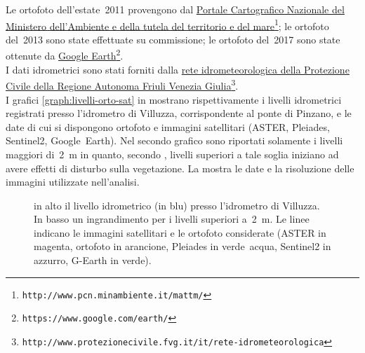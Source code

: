\documentclass[12pt,a4paper,italian,twoside]{scrbook}
\begin{document}
Le ortofoto dell'estate~2011 provengono dal \href{http://www.pcn.minambiente.it/mattm/}{Portale Cartografico Nazionale del Ministero dell'Ambiente e della tutela del territorio e del mare}\footnote{\texttt{http://www.pcn.minambiente.it/mattm/}};
le ortofoto del~2013 sono state effettuate su commissione; 
%
%
le ortofoto del~2017 sono state ottenute da \href{https://www.google.com/earth/}{Google Earth}\footnote{\texttt{https://www.google.com/earth/}}.
\\
I dati idrometrici sono stati forniti dalla \href{http://www.protezionecivile.fvg.it/it/rete-idrometeorologica}{rete idrometeorologica della Protezione Civile della Regione Autonoma Friuli Venezia Giulia}\footnote{\texttt{http://www.protezionecivile.fvg.it/it/rete-idrometeorologica}}.
\\
I grafici \vref{graph:livelli-orto-sat} in  mostrano rispettivamente i livelli idrometrici registrati presso l'idrometro di Villuzza, corrispondente al ponte di Pinzano, e le date di cui si dispongono ortofoto e immagini satellitari (ASTER, Pleiades, Sentinel2, Google~Earth). 
Nel secondo grafico sono riportati solamente i livelli maggiori di~\SI{2}{\m} in quanto, secondo \cite{Bertoldi:2009-2m}, livelli superiori a tale soglia iniziano ad avere effetti di disturbo sulla vegetazione.
La  mostra le date e la risoluzione delle immagini utilizzate nell'analisi.
\begin{figure}[p]
	\centering
	
	
	\caption[livelli idrometrici e foto aeree - satellitari]{in alto il livello idrometrico (in blu) presso l'idrometro di Villuzza. 
	In basso un ingrandimento per i livelli superiori a~\SI{2}{\m}. Le linee indicano le immagini satellitari e le ortofoto considerate (ASTER in magenta, ortofoto in arancione, Pleiades in verde~acqua, Sentinel2 in azzurro, G-Earth in verde).}
	\label{graph:livelli-orto-sat}
\end{figure}
\end{document}
